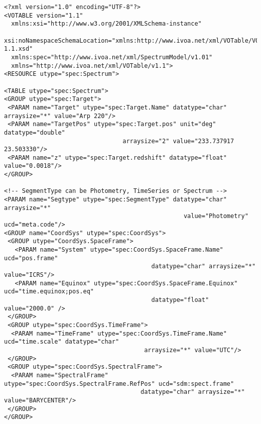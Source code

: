 
{ \footnotesize
\begin{flushleft}


\begin{fmpage}

\begin{verbatim}
<?xml version="1.0" encoding="UTF-8"?>
<VOTABLE version="1.1"
  xmlns:xsi="http://www.w3.org/2001/XMLSchema-instance"
  xsi:noNamespaceSchemaLocation="xmlns:http://www.ivoa.net/xml/VOTable/VOTable-1.1.xsd" 
  xmlns:spec="http://www.ivoa.net/xml/SpectrumModel/v1.01"
  xmlns="http://www.ivoa.net/xml/VOTable/v1.1">
<RESOURCE utype="spec:Spectrum">

<TABLE utype="spec:Spectrum">   
<GROUP utype="spec:Target">
 <PARAM name="Target" utype="spec:Target.Name" datatype="char" arraysize="*" value="Arp 220"/>
 <PARAM name="TargetPos" utype="spec:Target.pos" unit="deg" datatype="double" 
                                 arraysize="2" value="233.737917 23.503330"/>
 <PARAM name="z" utype="spec:Target.redshift" datatype="float" value="0.0018"/>
</GROUP>

<!-- SegmentType can be Photometry, TimeSeries or Spectrum -->
<PARAM name="Segtype" utype="spec:SegmentType" datatype="char" arraysize="*" 
                                                  value="Photometry" ucd="meta.code"/>
<GROUP name="CoordSys" utype="spec:CoordSys">
 <GROUP utype="CoordSys.SpaceFrame">
   <PARAM name="System" utype="spec:CoordSys.SpaceFrame.Name" ucd="pos.frame" 
                                         datatype="char" arraysize="*" value="ICRS"/>
   <PARAM name="Equinox" utype="spec:CoordSys.SpaceFrame.Equinox" ucd="time.equinox;pos.eq" 
                                         datatype="float" value="2000.0" />
 </GROUP>
 <GROUP utype="spec:CoordSys.TimeFrame">
  <PARAM name="TimeFrame" utype="spec:CoordSys.TimeFrame.Name" ucd="time.scale" datatype="char" 
                                       arraysize="*" value="UTC"/>
 </GROUP>
 <GROUP utype="spec:CoordSys.SpectralFrame">
  <PARAM name="SpectralFrame" utype="spec:CoordSys.SpectralFrame.RefPos" ucd="sdm:spect.frame" 
                                      datatype="char" arraysize="*" value="BARYCENTER"/>
 </GROUP>
</GROUP>

\end{verbatim}
\end{fmpage}

\begin{fmpage}
\begin{verbatim}



\end{verbatim}
\end{fmpage}
\end{flushleft}}
